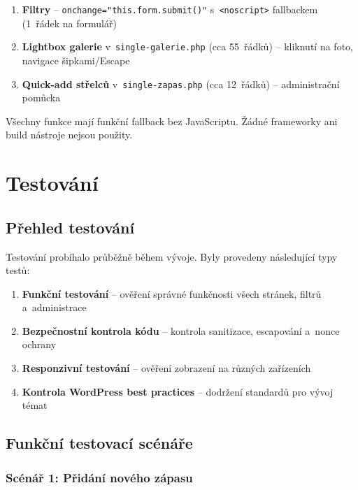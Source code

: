 \documentclass[12pt,a4paper]{article}
\begin{document}
\begin{enumerate}
    \item \textbf{Filtry} -- \texttt{onchange="this.form.submit()"} s~\texttt{<noscript>} fallbackem (1~řádek na formulář)
    \item \textbf{Lightbox galerie} v~\texttt{single-galerie.php} (cca 55~řádků) -- kliknutí na foto, navigace šipkami/Escape
    \item \textbf{Quick-add střelců} v~\texttt{single-zapas.php} (cca 12~řádků) -- administrační pomůcka
\end{enumerate}

Všechny funkce mají funkční fallback bez JavaScriptu. Žádné frameworky ani build nástroje nejsou použity.

\clearpage
\section{Testování}

\subsection{Přehled testování}

Testování probíhalo průběžně během vývoje. Byly provedeny následující typy testů:

\begin{enumerate}
    \item \textbf{Funkční testování} -- ověření správné funkčnosti všech stránek, filtrů a~administrace
    \item \textbf{Bezpečnostní kontrola kódu} -- kontrola sanitizace, escapování a~nonce ochrany
    \item \textbf{Responzivní testování} -- ověření zobrazení na různých zařízeních
    \item \textbf{Kontrola WordPress best practices} -- dodržení standardů pro vývoj témat~\cite{themehandbook}
\end{enumerate}

\subsection{Funkční testovací scénáře}

\subsubsection*{Scénář 1: Přidání nového zápasu}
\end{document}
